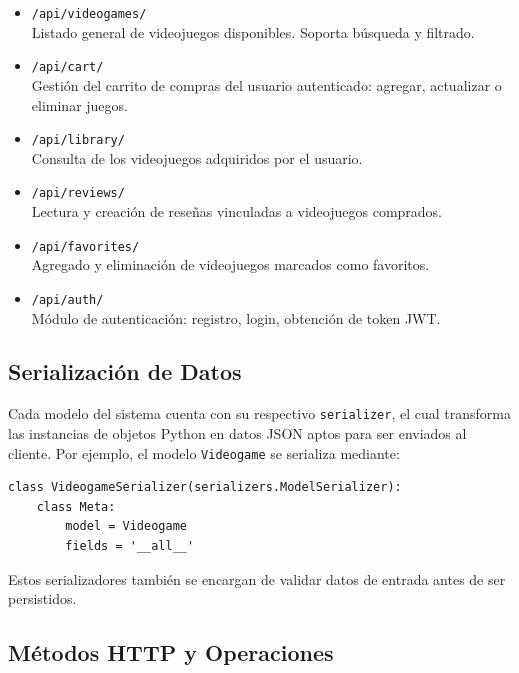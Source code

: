 \documentclass{article}
\begin{document}
\begin{itemize}
    \item \texttt{/api/videogames/} \\
    Listado general de videojuegos disponibles. Soporta búsqueda y filtrado.

    \item \texttt{/api/cart/} \\
    Gestión del carrito de compras del usuario autenticado: agregar, actualizar o eliminar juegos.

    \item \texttt{/api/library/} \\
    Consulta de los videojuegos adquiridos por el usuario.

    \item \texttt{/api/reviews/} \\
    Lectura y creación de reseñas vinculadas a videojuegos comprados.

    \item \texttt{/api/favorites/} \\
    Agregado y eliminación de videojuegos marcados como favoritos.

    \item \texttt{/api/auth/} \\
    Módulo de autenticación: registro, login, obtención de token JWT.
\end{itemize}

\subsection{Serialización de Datos}

Cada modelo del sistema cuenta con su respectivo \texttt{serializer}, el cual transforma las instancias de objetos Python en datos JSON aptos para ser enviados al cliente. Por ejemplo, el modelo \texttt{Videogame} se serializa mediante:

\begin{verbatim}
class VideogameSerializer(serializers.ModelSerializer):
    class Meta:
        model = Videogame
        fields = '__all__'
\end{verbatim}

Estos serializadores también se encargan de validar datos de entrada antes de ser persistidos.

\subsection{Métodos HTTP y Operaciones}
\end{document}
